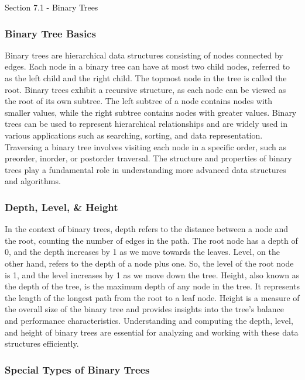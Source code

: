 \begin{notes}{Section 7.1 - Binary Trees}
    \subsubsection*{Binary Tree Basics}

    Binary trees are hierarchical data structures consisting of nodes connected by edges. Each node in a binary tree can have at most two child nodes, referred to as the left child and the right child. The topmost node in the tree is called the root. Binary trees exhibit a recursive structure, as each node can be viewed as the root of its own subtree. 
    The left subtree of a node contains nodes with smaller values, while the right subtree contains nodes with greater values. Binary trees can be used to represent hierarchical relationships and are widely used in various applications such as searching, sorting, and data representation. Traversing a binary tree involves visiting each node in a specific order, 
    such as preorder, inorder, or postorder traversal. The structure and properties of binary trees play a fundamental role in understanding more advanced data structures and algorithms.
    
    \subsubsection*{Depth, Level, \& Height}
    
    In the context of binary trees, depth refers to the distance between a node and the root, counting the number of edges in the path. The root node has a depth of 0, and the depth increases by 1 as we move towards the leaves. Level, on the other hand, refers to the depth of a node plus one. So, the level of the root node is 1, and the level 
    increases by 1 as we move down the tree. Height, also known as the depth of the tree, is the maximum depth of any node in the tree. It represents the length of the longest path from the root to a leaf node. Height is a measure of the overall size of the binary tree and provides insights into the tree's balance and performance characteristics. 
    Understanding and computing the depth, level, and height of binary trees are essential for analyzing and working with these data structures efficiently.
    
    \subsubsection*{Special Types of Binary Trees}
    

\end{notes}
